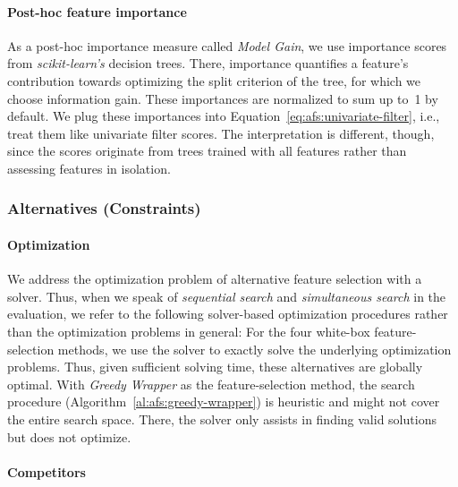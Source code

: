 \documentclass[iicol, sn-basic, Numbered]{sn-jnl} %
\theoremstyle{plain}
\theoremstyle{definition}
\begin{document}
\paragraph{Post-hoc feature importance}

As a post-hoc importance measure called \emph{Model Gain}, we use importance scores from \emph{scikit-learn's} decision trees.
There, importance quantifies a feature's contribution towards optimizing the split criterion of the tree, for which we choose information gain.
These importances are normalized to sum up to~1 by default.
We plug these importances into Equation~\ref{eq:afs:univariate-filter}, i.e., treat them like univariate filter scores.
The interpretation is different, though, since the scores originate from trees trained with all features rather than assessing features in isolation.

\subsubsection{Alternatives (Constraints)}
\label{sec:afs:experimental-design:approaches:alternatives}

\paragraph{Optimization}

We address the optimization problem of alternative feature selection with a solver.
Thus, when we speak of \emph{sequential search} and \emph{simultaneous search} in the evaluation, we refer to the following solver-based optimization procedures rather than the optimization problems in general:
For the four white-box feature-selection methods, we use the solver to exactly solve the underlying optimization problems.
Thus, given sufficient solving time, these alternatives are globally optimal.
With \emph{Greedy Wrapper} as the feature-selection method, the search procedure (Algorithm~\ref{al:afs:greedy-wrapper}) is heuristic and might not cover the entire search space.
There, the solver only assists in finding valid solutions but does not optimize.

\paragraph{Competitors}
\end{document}
